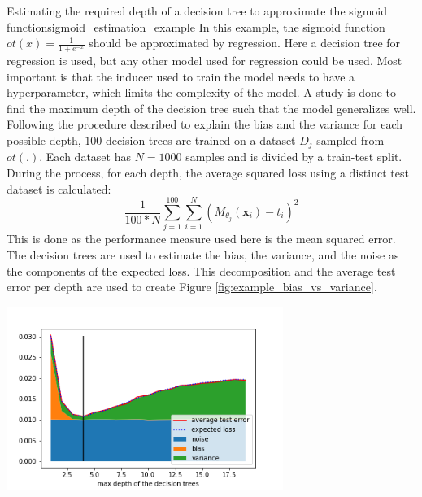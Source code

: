 \begin{Bsp}{Estimating the required depth of a decision tree to approximate the sigmoid function}{sigmoid_estimation_example}
In this example, the sigmoid function $ot(x) = \frac{1}{1 + e^{-x}}$ should be approximated by regression. Here a decision tree for regression is used, but any other model used for regression could be used. Most important is that the inducer used to train the model needs to have a hyperparameter, which limits the complexity of the model. A study is done to find the maximum depth of the decision tree such that the model generalizes well. Following the procedure described to explain the bias and the variance for each possible depth, $100$ decision trees are trained on a dataset $D_j$ sampled from $ot(.)$. Each dataset has $N = 1000$ samples and is divided by a train-test split. During the process, for each depth, the average squared loss using a distinct test dataset is calculated:
\[
\frac{1}{100 * N} \sum_{j=1}^{100} \sum_{i=1}^N (M_{\theta_j}(\mathbf{x}_i) - t_i)^2
\]
This is done as the performance measure used here is the mean squared error.
The decision trees are used to estimate the bias, the variance, and the noise as the components of the expected loss. This decomposition and the average test error per depth are used to create Figure \ref{fig:example_bias_vs_variance}.

\captionsetup{type=htypei}
\begin{minipage}[t]{\linewidth}
            \centering
            \vspace{1ex}
            \includegraphics[width=9cm]{images/ml_basics/bias_variance_tradeoff.png}
            \label{fig:example_bias_vs_variance}
            \vspace{1ex}
\end{minipage}


\end{Bsp}
